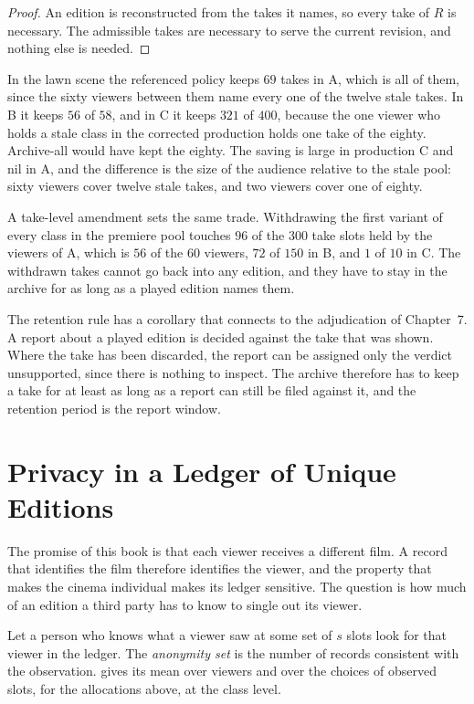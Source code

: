 \documentclass[11pt,twoside,openright]{book}
\theoremstyle{plain}
\theoremstyle{definition}
\theoremstyle{remark}
\begin{document}
\begin{proof}
An edition is reconstructed from the takes it names, so every take of $R$ is necessary. The admissible takes are necessary to serve the current revision, and nothing else is needed.
\end{proof}

In the lawn scene the referenced policy keeps $69$ takes in A, which is all of them, since the sixty viewers between them name every one of the twelve stale takes. In B it keeps $56$ of $58$, and in C it keeps $321$ of $400$, because the one viewer who holds a stale class in the corrected production holds one take of the eighty. Archive-all would have kept the eighty. The saving is large in production C and nil in A, and the difference is the size of the audience relative to the stale pool: sixty viewers cover twelve stale takes, and two viewers cover one of eighty.

A take-level amendment sets the same trade. Withdrawing the first variant of every class in the premiere pool touches $96$ of the $300$ take slots held by the viewers of A, which is $56$ of the $60$ viewers, $72$ of $150$ in B, and $1$ of $10$ in C. The withdrawn takes cannot go back into any edition, and they have to stay in the archive for as long as a played edition names them.

The retention rule has a corollary that connects to the adjudication of Chapter~7. A report about a played edition is decided against the take that was shown. Where the take has been discarded, the report can be assigned only the verdict unsupported, since there is nothing to inspect. The archive therefore has to keep a take for at least as long as a report can still be filed against it, and the retention period is the report window.

\section{Privacy in a Ledger of Unique Editions}\label{sec:privacy}

The promise of this book is that each viewer receives a different film. A record that identifies the film therefore identifies the viewer, and the property that makes the cinema individual makes its ledger sensitive. The question is how much of an edition a third party has to know to single out its viewer.

Let a person who knows what a viewer saw at some set of $s$ slots look for that viewer in the ledger. The \emph{anonymity set} is the number of records consistent with the observation.  gives its mean over viewers and over the choices of observed slots, for the allocations above, at the class level.
\end{document}
